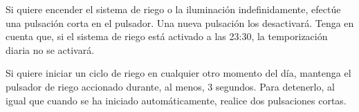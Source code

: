 Si quiere encender el sistema de riego o la iluminaci\'on indefinidamente, efect\'ue una pulsaci\'on corta en el pulsador. Una nueva pulsaci\'on los desactivar\'a. Tenga en cuenta que, si el sistema de riego est\'a activado a las 23:30, la temporizaci\'on diaria no se activar\'a.

Si quiere iniciar un ciclo de riego en cualquier otro momento del d\'ia, mantenga el pulsador de riego accionado durante, al menos, 3 segundos. Para detenerlo, al igual que cuando se ha iniciado autom\'aticamente, realice dos pulsaciones cortas.